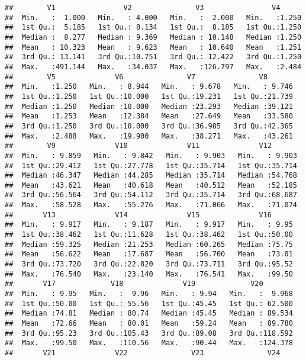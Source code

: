\documentclass[
]{article}
\begin{document}
\begin{verbatim}
##        V1                V2               V3                V4       
##  Min.   :  1.000   Min.   : 4.000   Min.   :  2.000   Min.   :1.250  
##  1st Qu.:  5.185   1st Qu.: 8.134   1st Qu.:  8.185   1st Qu.:1.250  
##  Median :  8.277   Median : 9.369   Median : 10.148   Median :1.250  
##  Mean   : 10.323   Mean   : 9.623   Mean   : 10.640   Mean   :1.251  
##  3rd Qu.: 13.141   3rd Qu.:10.751   3rd Qu.: 12.422   3rd Qu.:1.250  
##  Max.   :491.144   Max.   :34.037   Max.   :126.797   Max.   :2.484  
##        V5              V6               V7               V8        
##  Min.   :1.250   Min.   : 8.944   Min.   : 9.678   Min.   : 9.746  
##  1st Qu.:1.250   1st Qu.:10.000   1st Qu.:19.231   1st Qu.:21.739  
##  Median :1.250   Median :10.000   Median :23.293   Median :39.121  
##  Mean   :1.253   Mean   :12.384   Mean   :27.649   Mean   :33.580  
##  3rd Qu.:1.250   3rd Qu.:10.000   3rd Qu.:36.985   3rd Qu.:42.365  
##  Max.   :2.488   Max.   :19.900   Max.   :38.271   Max.   :43.261  
##        V9              V10              V11              V12        
##  Min.   : 9.859   Min.   : 9.842   Min.   : 9.903   Min.   : 9.903  
##  1st Qu.:29.412   1st Qu.:27.778   1st Qu.:35.714   1st Qu.:35.714  
##  Median :46.347   Median :44.285   Median :35.714   Median :54.768  
##  Mean   :43.621   Mean   :40.618   Mean   :40.512   Mean   :52.185  
##  3rd Qu.:56.564   3rd Qu.:54.112   3rd Qu.:35.714   3rd Qu.:68.687  
##  Max.   :58.528   Max.   :55.276   Max.   :71.066   Max.   :71.074  
##       V13              V14              V15              V16       
##  Min.   : 9.917   Min.   : 9.187   Min.   : 9.917   Min.   : 9.95  
##  1st Qu.:38.462   1st Qu.:11.628   1st Qu.:38.462   1st Qu.:50.00  
##  Median :59.325   Median :21.253   Median :60.265   Median :75.75  
##  Mean   :56.622   Mean   :17.687   Mean   :56.700   Mean   :73.01  
##  3rd Qu.:73.720   3rd Qu.:22.820   3rd Qu.:73.711   3rd Qu.:95.52  
##  Max.   :76.540   Max.   :23.140   Max.   :76.541   Max.   :99.50  
##       V17             V18              V19             V20         
##  Min.   : 9.95   Min.   :  9.96   Min.   : 9.94   Min.   :  9.968  
##  1st Qu.:50.00   1st Qu.: 55.56   1st Qu.:45.45   1st Qu.: 62.500  
##  Median :74.81   Median : 80.74   Median :45.45   Median : 89.534  
##  Mean   :72.66   Mean   : 80.01   Mean   :59.24   Mean   : 89.780  
##  3rd Qu.:95.23   3rd Qu.:105.43   3rd Qu.:89.08   3rd Qu.:118.592  
##  Max.   :99.50   Max.   :110.56   Max.   :90.44   Max.   :124.378  
##       V21              V22               V23               V24         

\end{verbatim}
\end{document}
